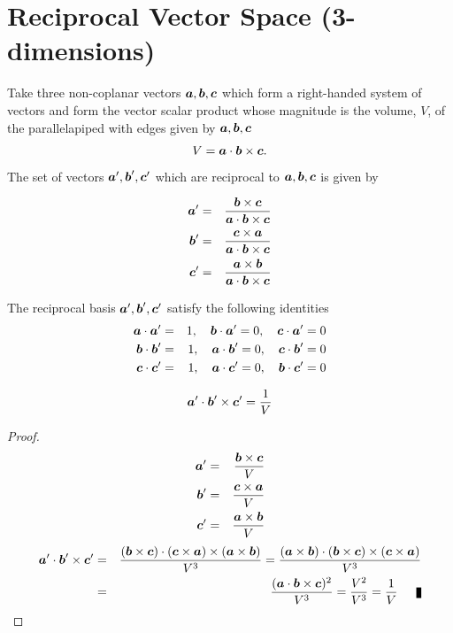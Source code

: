 \section{Reciprocal Vector Space (3-dimensions)}
Take three non-coplanar vectors $\a, \b, \c$ which form a right-handed system of vectors and form the vector scalar product whose magnitude is the volume, $V$, of the parallelapiped with edges given by $\a, \b, \c$ 
\[ V = \a\cdot\b \times \c. \] The set of vectors $\a', \b', \c'$ which are reciprocal to $\a, \b, \c$  is given by

\begin{eqnarray*}
\a'&=& { \b \times\c\over \a\cdot\b \times \c} \\   
\b'&=& { \c \times\a\over \a\cdot\b \times \c} \\
\c'&=& { \a \times\b\over \a\cdot\b \times \c} \\
\end{eqnarray*}

The reciprocal basis $\a', \b', \c'$ satisfy the following identities
\begin{eqnarray*}
\a\cdot \a'&=& 1, \quad \b\cdot \a' = 0, \quad \c\cdot \a' =0 \\   
\b\cdot \b'&=& 1, \quad \a\cdot \b' = 0, \quad \c\cdot \b' =0  \\
\c\cdot \c'&=& 1,  \quad \a\cdot \c' = 0, \quad \b\cdot \c' =0 \\
\end{eqnarray*}
 
\begin{theorem}[Reciprocal Basis has Reciprocal Volume = 1/V]
\[ \a'\cdot\b' \times \c' = {1\over V}  \]
\end{theorem}
\begin{proof}
\begin{eqnarray*}
\a'&=& { \b \times\c\over V} \\   
\b'&=& { \c \times\a\over V} \\
\c'&=& { \a \times\b\over V} \\
\end{eqnarray*}
\begin{eqnarray*}
\a'\cdot\b' \times \c'  &=& {(\b\times \c)\cdot(\c\times\a)\times(\a\times \b)\over V^3} = {(\a\times \b)\cdot (\b\times \c)\times(\c\times\a) \over V^3} \\
                                                       &=& {(\a\cdot \b \times \c)^2\over V^3} = {V^2\over V^3} = {1\over V}\qed
\end{eqnarray*}
\end{proof}